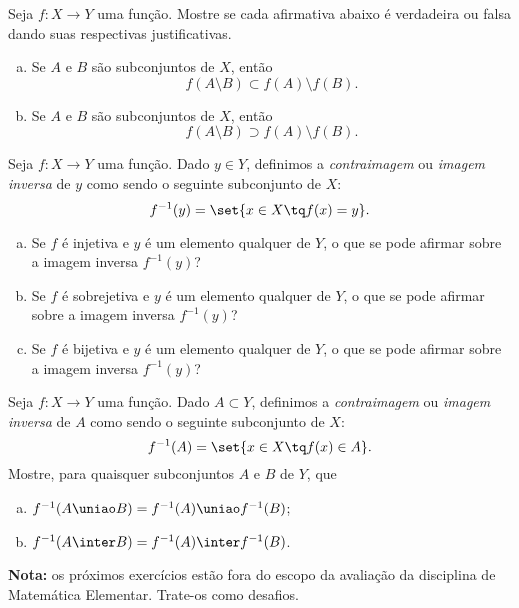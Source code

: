 \begin{exercise}
    Seja $f: X \to Y$ uma função. Mostre se cada afirmativa abaixo é verdadeira ou falsa dando suas respectivas justificativas.

    \begin{enumerate}[a)]
        \item Se $A$ e $B$ são subconjuntos de $X$, então $$f \left( A \setminus B \right) \subset f(A) \setminus f(B).$$
        \item  Se $A$ e $B$ são subconjuntos de $X$, então $$f \left( A \setminus B \right) \supset f(A) \setminus f(B).$$
    \end{enumerate}
\end{exercise}

\begin{exercise}
    Seja $f: X \to Y$ uma função. Dado $y \in Y$, definimos a
\emph{contraimagem} ou \emph{imagem inversa} de $y$ como sendo o
seguinte subconjunto de $X$: $$ f^{-1}(y) = \set{x \in X \tq
f(x)=y}.$$
\begin{enumerate}[(a)]
  \item Se $f$ é injetiva e $y$ é um elemento qualquer de $Y$, o que
  se pode afirmar sobre a imagem inversa $f^{-1}(y)$?
  \item Se $f$ é sobrejetiva e $y$ é um elemento qualquer de $Y$, o que
  se pode afirmar sobre a imagem inversa $f^{-1}(y)$?
  \item Se $f$ é bijetiva e $y$ é um elemento qualquer de $Y$, o que
  se pode afirmar sobre a imagem inversa $f^{-1}(y)$?
\end{enumerate}
\end{exercise}

\begin{exercise}
    Seja $f: X \to Y$ uma função. Dado $A \subset Y$, definimos a
\emph{contraimagem} ou \emph{imagem inversa} de $A$ como sendo o
seguinte subconjunto de $X$: $$ f^{-1}(A) = \set{x \in X \tq f(x)\in
A}.$$ Mostre, para quaisquer subconjuntos $A$ e $B$ de $Y$, que
\begin{enumerate}[(a)]
  \item $f^{-1} (A \uniao B) = f^{-1} (A) \uniao f^{-1} (B)$;
  \item $f^{-1} (A \inter B) = f^{-1} (A) \inter f^{-1} (B)$.
\end{enumerate}
\end{exercise}

\textbf{Nota:} os próximos exercícios estão fora do escopo da avaliação da disciplina de Matemática Elementar.
Trate-os como desafios.

